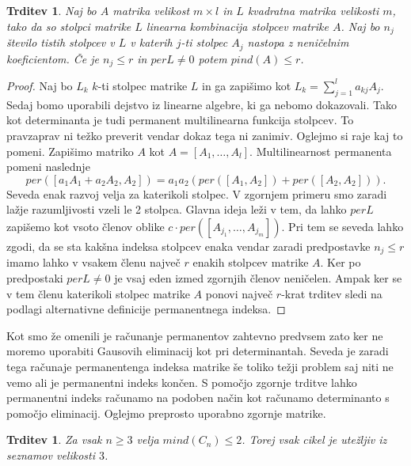 \documentclass[12pt,a4paper,twoside]{article}
\theoremstyle{definition} %
\theoremstyle{plain} %
\newtheorem{trditev}[definicija]{Trditev}
\numberwithin{equation}{section}  %
\begin{document}
\begin{trditev}
\label{pind}
Naj bo $A$ matrika velikost $m \times l$ in $L$ kvadratna matrika velikosti $m$, tako da so stolpci matrike $L$ linearna kombinacija stolpcev matrike $A$. Naj bo $n_j$ število tistih stolpcev v $L$ v katerih $j$-ti stolpec $A_j$ nastopa z neničelnim koeficientom. Če je $n_j \le r$ in $perL \neq 0$ potem $pind(A) \le r$.
\end{trditev}
\begin{proof}
Naj bo $L_k$ $k$-ti stolpec matrike $L$ in ga zapišimo kot $L_k = \sum_{j=1}^l a_{kj}A_j$. Sedaj bomo uporabili dejstvo iz linearne algebre, ki ga nebomo dokazovali. Tako kot determinanta je tudi permanent multilinearna funkcija stolpcev. To pravzaprav ni težko preverit vendar dokaz tega ni zanimiv. Oglejmo si raje kaj to pomeni. Zapišimo matriko $A$ kot $A = [A_1, \ldots, A_l]$. Multilinearnost permanenta pomeni naslednje
$$ per([a_1A_1 + a_2A_2, A_2]) = a_1 a_2 \left( per([A_1, A_2]) + per([A_2, A_2]) \right).$$
Seveda enak razvoj velja za katerikoli stolpec. V zgornjem primeru smo zaradi lažje razumljivosti vzeli le 2 stolpca. Glavna ideja leži v tem, da lahko $perL$ zapišemo kot vsoto členov oblike $c \cdot per([A_{j_1}, \dots, A_{j_m}])$. Pri tem se seveda lahko zgodi, da se sta kakšna indeksa stolpcev enaka vendar zaradi predpostavke $n_j \le r$ imamo lahko v vsakem členu največ $r$ enakih stolpcev matrike $A$. Ker po predpostaki $perL \neq 0$ je vsaj eden izmed zgornjih členov neničelen. Ampak ker se v tem členu katerikoli stolpec matrike $A$ ponovi največ $r$-krat trditev sledi na podlagi alternativne definicije permanentnega indeksa.
\end{proof}

Kot smo že omenili je računanje permanentov zahtevno predvsem zato ker ne moremo uporabiti Gausovih eliminacij kot pri determinantah. Seveda je zaradi tega računaje permanentenga indeksa matrike še toliko težji problem saj niti ne vemo ali je permanentni indeks končen. S pomočjo zgornje trditve lahko permanentni indeks računamo na podoben način kot računamo determinanto s pomočjo eliminacij. Oglejmo preprosto uporabno zgornje matrike.

\begin{trditev}
Za vsak $n \ge 3$ velja $mind(C_n) \le 2$. Torej vsak cikel je utežljiv iz seznamov velikosti $3$.
\end{trditev}
\end{document}
